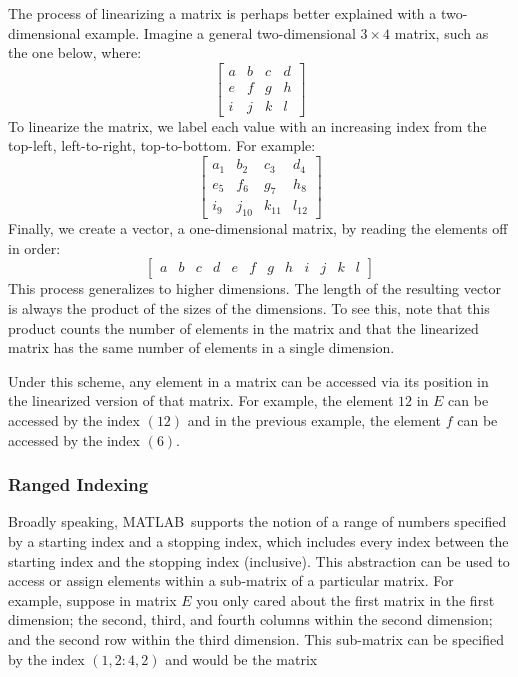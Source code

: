 \documentclass[11pt,conference]{IEEEtran}
\newcommand{\matlab}{MATLAB}
\theoremstyle{plain} %
\theoremstyle{definition}
\theoremstyle{remark}
\begin{document}
The process of linearizing a matrix is perhaps better explained with a
two-dimensional example. Imagine a general two-dimensional \(3 \times 4\) matrix,
such as the one below, where:
\begin{equation*}
    \begin{bmatrix}
        a & b & c & d \\
        e & f & g & h \\
        i & j & k & l
    \end{bmatrix}
\end{equation*}
To linearize the matrix, we label each value with an increasing index from the
top-left, left-to-right, top-to-bottom. For example:
\begin{equation*}
    \begin{bmatrix}
        a_1 & b_2 & c_3 & d_4 \\
        e_5 & f_6 & g_7 & h_8 \\
        i_9 & j_{10} & k_{11} & l_{12}
    \end{bmatrix}
\end{equation*}
Finally, we create a vector, a one-dimensional matrix, by reading the elements
off in order:
\setcounter{MaxMatrixCols}{20}
\begin{equation*}
    \begin{bmatrix}
        a & b & c & d & e & f & g & h & i & j & k & l
    \end{bmatrix}
\end{equation*}
This process generalizes to higher dimensions. The length of the resulting
vector is always the product of the sizes of the dimensions. To see this, note
that this product counts the number of elements in the matrix and that the
linearized matrix has the same number of elements in a single dimension.

Under this scheme, any element in a matrix can be accessed via its position in
the linearized version of that matrix. For example, the element \(12\) in \(E\)
can be accessed by the index \((12)\) and in the previous example, the element
\(f\) can be accessed by the index \((6)\).

\subsubsection{Ranged Indexing}\label{S:ranged_indexing}

Broadly speaking, \matlab\ supports the notion of a range of numbers specified
by a starting index and a stopping index, which includes every index between the
starting index and the stopping index (inclusive). This abstraction can be used
to access or assign elements within a sub-matrix of a particular matrix. For
example, suppose in matrix \(E\) you only cared about the first matrix in the
first dimension; the second, third, and fourth columns within the second
dimension; and the second row within the third dimension. This sub-matrix can be
specified by the index \((1, 2:4, 2)\) and would be the matrix
\end{document}
